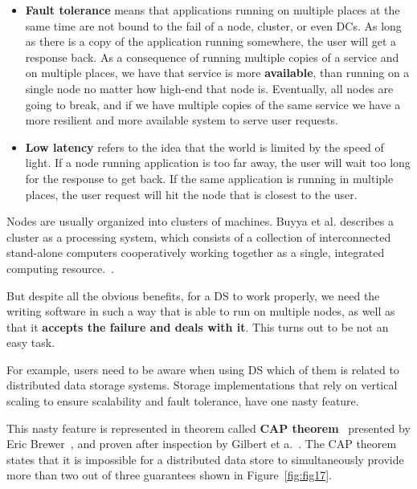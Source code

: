 \begin{itemize}
	\item \textbf{Fault tolerance} means that applications running on multiple places at the same time are not bound to the fail of a node, cluster, or even DCs. As long as there is a copy of the application running somewhere, the user will get a response back. As a consequence of running multiple copies of a service and on multiple places, we have that service is more \textbf{available}, than running on a single node no matter how high-end that node is. Eventually, all nodes are going to break, and if we have multiple copies of the same service we have a more resilient and more available system to serve user requests.
	\item \textbf{Low latency} refers to the idea that the world is limited by the speed of light. If a node running application is too far away, the user will wait too long for the response to get back. If the same application is running in multiple places, the user request will hit the node that is closest to the user.
\end{itemize}

\noindent
Nodes are usually organized into clusters of machines. Buyya et al. describes a cluster as a processing system, which consists of a collection of interconnected stand-alone computers cooperatively working together as a single, integrated computing resource.~\cite{Buyya}.

But despite all the obvious benefits, for a DS to work properly, we need the writing software in such a way that is able to run on multiple nodes, as well as that it \textbf{accepts the failure and deals with it}. This turns out to be not an easy task.

For example, users need to be aware when using DS which of them is related to distributed data storage systems. Storage implementations that rely on vertical scaling to ensure scalability and fault tolerance, have one nasty feature. 

This nasty feature is represented in theorem called \textbf{CAP theorem}~\label{lab:cap} presented by Eric Brewer~\cite{Brewer2000}, and proven after inspection by Gilbert et a.~\cite{GilbertL02}. The CAP theorem states that it is impossible for a distributed data store to simultaneously provide more than two out of three guarantees shown in Figure~\ref{fig:fig17}.

